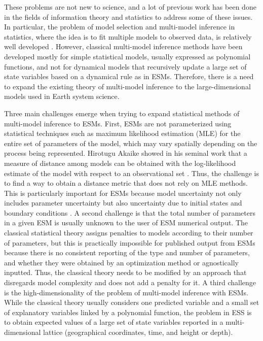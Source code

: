 \documentclass[gmd, manuscript]{copernicus}
\begin{document}
These problems are not new to science, and a lot of previous work has been done in the fields of information theory and statistics to address some of these issues. In particular, the problem of model selection and multi-model inference in statistics, where the idea is to fit multiple models to observed data, is relatively well developed \citep{Anderson2007, Burnham2002, Millington2011, Claeskens2008}. However, classical multi-model inference methods have been developed mostly for simple statistical models, usually expressed as polynomial functions, and not for dynamical models that recursively update a large set of state variables based on a dynamical rule as in ESMs. Therefore, there is a need to expand the existing theory of multi-model inference to the large-dimensional models used in Earth system science.

Three main challenges emerge when trying to expand statistical methods of multi-model inference to ESMs. First, ESMs are not parameterized using statistical techniques such as maximum likelihood estimation (MLE) for the entire set of parameters of the model, which may vary spatially depending on the process being represented. Hirotugu Akaike showed in his seminal work that a measure of distance among models can be obtained with the log-likelihood estimate of the model with respect to an observational set \citep{Akaike1974, Akaike1981}. Thus, the challenge is to find a way to obtain a distance metric that does not rely on MLE methods. This is particularly important for ESMs because model uncertainty not only includes parameter uncertainty but also uncertainty due to initial states and boundary conditions \citep{Tebaldi2007}.
A second challenge is that the total number of parameters in a given ESM is usually unknown to the user of ESM numerical output. The classical statistical theory assigns penalties to models according to their number of parameters, but this is practically impossible for published output from ESMs because there is no consistent reporting of the type and number of parameters, and whether they were obtained by an optimization method or agnostically inputted. Thus, the classical theory needs to be modified by an approach that disregards model complexity and does not add a penalty for it. 
A third challenge is the high-dimensionality of the problem of multi-model inference with ESMs. While the classical theory usually considers one predicted variable and a small set of explanatory variables linked by a polynomial function, the problem in ESS is to obtain expected values of a large set of state variables reported in a multi-dimensional lattice (geographical coordinates, time, and height or depth). 
\end{document}
